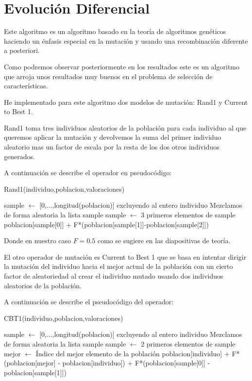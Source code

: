 \documentclass[12pt,a4paper]{article}
\begin{document}
	\section{Evolución Diferencial}
	\label{sec:DE}
	
	Este algoritmo es un algoritmo basado en la teoría de algoritmos genéticos haciendo un énfasis especial en la mutación y usando una recombinación diferente a posteriori. 
	
	Como podremos observar posteriormente en los resultados este es un algoritmo que arroja unos resultados muy buenos en el problema de selección de características.
	
	He implementado para este algoritmo dos modelos de mutación: Rand1 y Current to Best 1.
	
	Rand1 toma tres individuos aleatorios de la población para cada individuo al que queremos aplicar la mutación y devolvemos la suma del primer individuo aleatorio mas un factor de escala por la resta de los dos otros individuos generados.

	A continuación se describe el operador en pseudocódigo:
	
	\begin{algorithm}
		\caption{Rand1(individuo,poblacion,valoraciones)}
		\begin{algorithmic}			
			\STATE sample $\leftarrow$ [0,...,longitud(poblacion)] excluyendo al entero individuo
			\STATE Mezclamos de forma aleatoria la lista sample
			\STATE sample $\leftarrow$ 3 primeros elementos de sample
			\STATE
			\RETURN poblacion[sample[0]] + F*(poblacion[sample[1]]-poblacion[sample[2]])
		\end{algorithmic}
	\end{algorithm}
	
	Donde en nuestro caso $F=0.5$ como se sugiere en las diapositivas de teoría.
	
	El otro operador de mutación  es Current to Best 1 que se basa en intentar dirigir la mutación del individuo hacia el mejor actual de la población con un cierto factor de aleatoriedad al crear el individuo mutado usando dos individuos aleatorios de la población.
	
	A continuación se describe el pseudocódigo del operador:
	
	\begin{algorithm}
		\caption{CBT1(individuo,poblacion,valoraciones)}
		\begin{algorithmic}			
			\STATE sample $\leftarrow$ [0,...,longitud(poblacion)] excluyendo al entero individuo
			\STATE Mezclamos de forma aleatoria la lista sample
			\STATE sample $\leftarrow$ 2 primeros elementos de sample
			\STATE
			\STATE mejor $\leftarrow$ Índice del mejor elemento de la población
			\STATE
			\RETURN poblacion[individuo] + F*(poblacion[mejor] - poblacion[individuo]) + F*(poblacion[sample[0]] - poblacion[sample[1]])
		\end{algorithmic}
	\end{algorithm}
	
\end{document}

